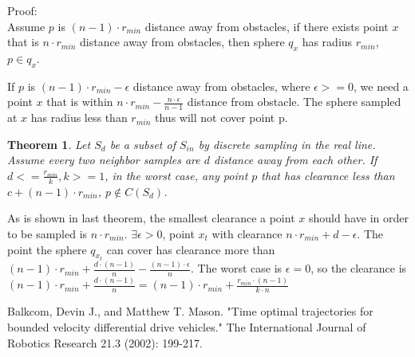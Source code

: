 \documentclass[12pt]{article}
\newtheorem{theorem}{Theorem}[section]
\begin{document}
  Proof:\\
  
  Assume $p$ is $(n-1) \cdot r_{min}$ distance away from obstacles, if there exists point $x$ that is $n \cdot r_{min}$ distance away from obstacles, then sphere $q_{x}$ has radius $r_{min}$, $p \in q_{x}$. 
  
  If $p$ is $(n-1) \cdot r_{min} - \epsilon$ distance away from obstacles, where $\epsilon >= 0$, we need a point $x$ that is within $n \cdot r_{min} - \frac{n \cdot \epsilon}{n-1}$ distance from obstacle.  The sphere sampled at $x$ has radius less than $r_{min}$ thus will not cover point p.
  
  \begin{theorem}
  Let $S_{d}$ be a subset of $S_{in}$ by discrete sampling in the real line. Assume every two neighbor samples are $d$ distance away from each other. If $d <= \frac{r_{min}}{k}, k>=1$, in the worst case, any point $p$ that has clearance less than $c + (n-1) \cdot r_{min}$, $p \notin C(S_d)$.
  \end{theorem}
  
  As is shown in last theorem, the smallest clearance a point $x$ should have in order to be sampled is $n \cdot r_{min}$. $\exists \epsilon > 0$, point $x_{t}$ with clearance $n \cdot r_{min} + d - \epsilon$. The point the sphere $q_{x_{t}}$ can cover has clearance more than  $(n-1) \cdot r_{min} + \frac{d \cdot (n-1)}{n} - \frac{(n-1) \cdot \epsilon}{n}$. The worst case is $\epsilon = 0$, so the clearance is $(n-1) \cdot r_{min} + \frac{d \cdot (n-1)}{n} = (n-1) \cdot r_{min} + \frac{r_{min} \cdot (n-1)}{k \cdot n}$
    
  \begin{thebibliography}{1}

   Balkcom, Devin J., and Matthew T. Mason. "Time optimal trajectories for bounded velocity differential drive vehicles." The International Journal of Robotics Research 21.3 (2002): 199-217.

  \end{thebibliography}
  
\end{document}
